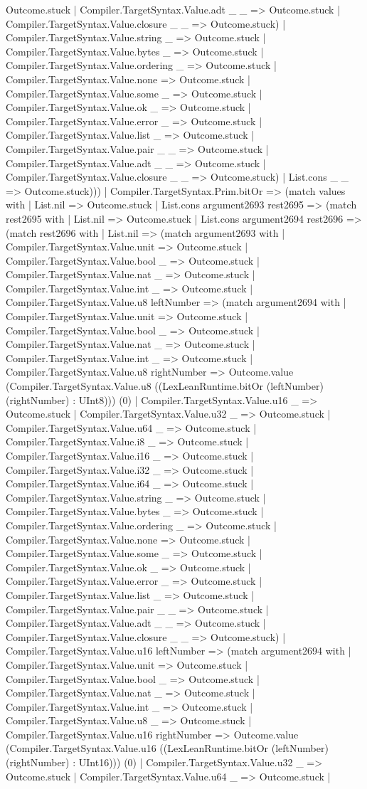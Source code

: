 \documentclass[11pt]{article}
\begin{document}
Outcome.stuck | Compiler.TargetSyntax.Value.adt \_ \_ => Outcome.stuck | Compiler.TargetSyntax.Value.closure \_ \_ => Outcome.stuck) | Compiler.TargetSyntax.Value.string \_ => Outcome.stuck | Compiler.TargetSyntax.Value.bytes \_ => Outcome.stuck | Compiler.TargetSyntax.Value.ordering \_ => Outcome.stuck | Compiler.TargetSyntax.Value.none => Outcome.stuck | Compiler.TargetSyntax.Value.some \_ => Outcome.stuck | Compiler.TargetSyntax.Value.ok \_ => Outcome.stuck | Compiler.TargetSyntax.Value.error \_ => Outcome.stuck | Compiler.TargetSyntax.Value.list \_ => Outcome.stuck | Compiler.TargetSyntax.Value.pair \_ \_ => Outcome.stuck | Compiler.TargetSyntax.Value.adt \_ \_ => Outcome.stuck | Compiler.TargetSyntax.Value.closure \_ \_ => Outcome.stuck) | List.cons \_ \_ => Outcome.stuck))) | Compiler.TargetSyntax.Prim.bitOr => (match values with | List.nil => Outcome.stuck | List.cons argument2693 rest2695 => (match rest2695 with | List.nil => Outcome.stuck | List.cons argument2694 rest2696 => (match rest2696 with | List.nil => (match argument2693 with | Compiler.TargetSyntax.Value.unit => Outcome.stuck | Compiler.TargetSyntax.Value.bool \_ => Outcome.stuck | Compiler.TargetSyntax.Value.nat \_ => Outcome.stuck | Compiler.TargetSyntax.Value.int \_ => Outcome.stuck | Compiler.TargetSyntax.Value.u8 leftNumber => (match argument2694 with | Compiler.TargetSyntax.Value.unit => Outcome.stuck | Compiler.TargetSyntax.Value.bool \_ => Outcome.stuck | Compiler.TargetSyntax.Value.nat \_ => Outcome.stuck | Compiler.TargetSyntax.Value.int \_ => Outcome.stuck | Compiler.TargetSyntax.Value.u8 rightNumber => Outcome.value (Compiler.TargetSyntax.Value.u8 ((LexLeanRuntime.bitOr (leftNumber) (rightNumber) : UInt8))) (0) | Compiler.TargetSyntax.Value.u16 \_ => Outcome.stuck | Compiler.TargetSyntax.Value.u32 \_ => Outcome.stuck | Compiler.TargetSyntax.Value.u64 \_ => Outcome.stuck | Compiler.TargetSyntax.Value.i8 \_ => Outcome.stuck | Compiler.TargetSyntax.Value.i16 \_ => Outcome.stuck | Compiler.TargetSyntax.Value.i32 \_ => Outcome.stuck | Compiler.TargetSyntax.Value.i64 \_ => Outcome.stuck | Compiler.TargetSyntax.Value.string \_ => Outcome.stuck | Compiler.TargetSyntax.Value.bytes \_ => Outcome.stuck | Compiler.TargetSyntax.Value.ordering \_ => Outcome.stuck | Compiler.TargetSyntax.Value.none => Outcome.stuck | Compiler.TargetSyntax.Value.some \_ => Outcome.stuck | Compiler.TargetSyntax.Value.ok \_ => Outcome.stuck | Compiler.TargetSyntax.Value.error \_ => Outcome.stuck | Compiler.TargetSyntax.Value.list \_ => Outcome.stuck | Compiler.TargetSyntax.Value.pair \_ \_ => Outcome.stuck | Compiler.TargetSyntax.Value.adt \_ \_ => Outcome.stuck | Compiler.TargetSyntax.Value.closure \_ \_ => Outcome.stuck) | Compiler.TargetSyntax.Value.u16 leftNumber => (match argument2694 with | Compiler.TargetSyntax.Value.unit => Outcome.stuck | Compiler.TargetSyntax.Value.bool \_ => Outcome.stuck | Compiler.TargetSyntax.Value.nat \_ => Outcome.stuck | Compiler.TargetSyntax.Value.int \_ => Outcome.stuck | Compiler.TargetSyntax.Value.u8 \_ => Outcome.stuck | Compiler.TargetSyntax.Value.u16 rightNumber => Outcome.value (Compiler.TargetSyntax.Value.u16 ((LexLeanRuntime.bitOr (leftNumber) (rightNumber) : UInt16))) (0) | Compiler.TargetSyntax.Value.u32 \_ => Outcome.stuck | Compiler.TargetSyntax.Value.u64 \_ => Outcome.stuck | 
\end{document}

